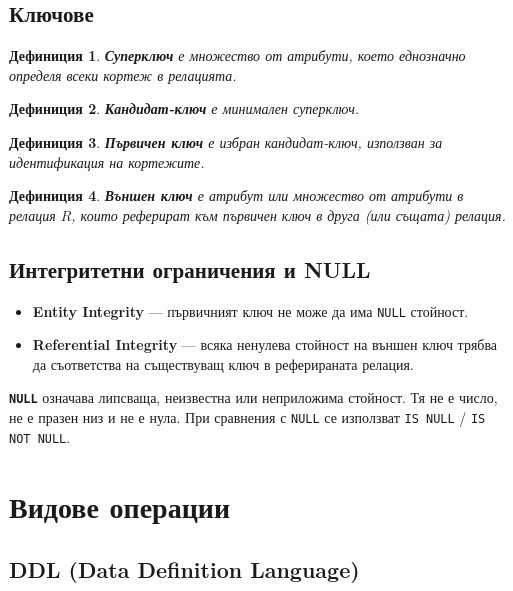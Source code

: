 \documentclass{scrartcl}
\newtheorem{definition}{Дефиниция}
\begin{document}
\begin{FlushLeft}
\subsection{Ключове}

\begin{definition}
\textbf{\textit{Суперключ}} е множество от атрибути, което еднозначно определя всеки кортеж в релацията.
\end{definition}

\begin{definition}
\textbf{\textit{Кандидат-ключ}} е минимален суперключ.
\end{definition}

\begin{definition}
\textbf{\textit{Първичен ключ}} е избран кандидат-ключ, използван за идентификация на кортежите.
\end{definition}

\begin{definition}
\textbf{\textit{Външен ключ}} е атрибут или множество от атрибути в релация $R$, които реферират към първичен ключ в друга (или същата) релация.
\end{definition}

\subsection{Интегритетни ограничения и NULL}

\begin{itemize}
    \item \textbf{Entity Integrity} --- първичният ключ не може да има \texttt{NULL} стойност.
    \item \textbf{Referential Integrity} --- всяка ненулева стойност на външен ключ трябва да съответства на съществуващ ключ в реферираната релация.
\end{itemize}

\textbf{\texttt{NULL}} означава липсваща, неизвестна или неприложима стойност. Тя не е число, не е празен низ и не е нула. При сравнения с \texttt{NULL} се използват \texttt{IS NULL} / \texttt{IS NOT NULL}.

\section{Видове операции}

\subsection{DDL (Data Definition Language)}


\end{FlushLeft}
\end{document}

